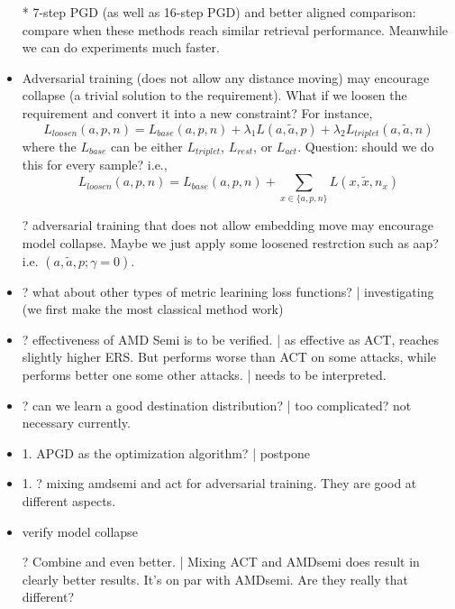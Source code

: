 \begin{itemize}
	\item [*] 7-step PGD (as well as 16-step PGD) and better aligned comparison:
		compare when these methods reach similar retrieval performance.
		Meanwhile we can do experiments much faster.

	\item Adversarial training (does not allow any distance moving) may
		encourage collapse (a trivial solution to the requirement). What if we
		loosen the requirement and convert it into a new constraint? For
		instance, \[
			L_{loosen}(a,p,n)=L_{base}(a,p,n)+\lambda_{1}L(a,\tilde{a},p)+\lambda_{2}L_{triplet}(a,\tilde{a},n)
		\] where the $L_{base}$ can be either $L_{triplet}$, $L_{rest}$, or
		$L_{act}$. Question: should we do this for every sample? i.e., \[
			L_{loosen}(a,p,n)=L_{base}(a,p,n)+\sum_{x\in\{a,p,n\}}L(x,\tilde{x},n_{x})
		\]

	\item [?] adversarial training that does not allow embedding move may
		encourage model collapse. Maybe we just apply some loosened restrction
		such as aap? i.e. $(a,\tilde{a},p;\gamma=0)$.

	\item ?  what about other types of metric learining loss functions? |
		investigating (we first make the most classical method work)

	\item ?  effectiveness of AMD Semi is to be verified. | as effective
		as ACT, reaches slightly higher ERS. But performs worse than ACT on
		some attacks, while performs better one some other attacks. | needs to
		be interpreted.

	\item ? can we learn a good destination distribution? | too
		complicated? not necessary currently.

	\item 1. APGD as the optimization algorithm? | postpone

	\item 1. ? mixing amdsemi and act for adversarial training. They are good
		at different aspects.

	\item verify model collapse

	\item [?] Combine and even better. | Mixing ACT and AMDsemi does result
		in clearly better results. It's on par with AMDsemi. Are they really
		that different?

\end{itemize}

